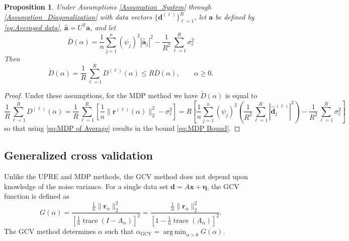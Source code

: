 \documentclass[12pt]{article}
\newcommand{\aVec}{\mathbf{a}}	%
\newcommand{\dVec}{\mathbf{d}}	%
\newcommand{\rVec}{\mathbf{r}}	%
\newcommand{\xVec}{\mathbf{x}}	%
\newcommand{\trans}[1]{{#1}^\mathsf{T}}	%
\DeclareMathOperator{\trace}{trace}		%
\newcommand{\dft}[1]{\widehat{#1}}	%
\newcommand{\regparam}{\alpha}  %
\DeclareMathOperator*{\argmin}{arg\,min}
\newcommand{\mfilt}{\psi}
\newcommand{\noise}{\eta}	%
\newcommand{\noiseSD}{\sigma}	%
\newcommand{\noiseVec}{\bm{\noise}}	%
\newcommand{\regres}{\mathbf{r}_{\regparam}}	%
\newcommand{\A}{A_{\regparam}}	%
\newcommand{\G}{G}	%
\newcommand{\GCV}{\text{GCV}}	%
\newcommand{\D}{D}	%
\newtheorem{proposition}{Proposition}[section]
\begin{document}
\begin{proposition}
Under Assumptions \ref{Assumption_System} through \ref{Assumption_Diagonalization} with data vectors $\{\dVec^{(\ell)}\}_{\ell=1}^R$, let $\aVec$ be defined by \eqref{eq:Averaged data}, $\dft{\aVec} = \trans{U}\aVec$, and let
\begin{equation}
\label{eq:MDP of Average}
\overline{\D}(\regparam) = \frac{1}{n}\sum_{j=1}^{n} \left(\mfilt_j\right)^2 |\dft{\aVec}_j|^2 - \frac{1}{R^2}\sum_{\ell=1}^R \noiseSD_{\ell}^2
\end{equation}
Then
\begin{equation}
\label{eq:MDP Bound}
\widetilde{\D}(\regparam) = \frac{1}{R} \sum_{\ell=1}^R \D^{(\ell)}(\regparam) \leq R \overline{\D}(\regparam), \qquad \regparam \geq 0.
\end{equation}
\end{proposition}
\begin{proof}
Under these assumptions, for the MDP method we have $\widetilde{\D}(\regparam)$ is equal to
\[\frac{1}{R} \sum_{\ell=1}^R \D^{(\ell)}(\regparam) = \frac{1}{R}\sum_{\ell=1}^R \left[\frac{1}{n}\|\rVec^{(\ell)}(\regparam)\|_2^2 - \noiseSD_{\ell}^2\right] = R\left[\frac{1}{n}\sum_{j=1}^{n} \left(\mfilt_j\right)^2\left(\frac{1}{R^2} \sum_{\ell=1}^R |\dft{\dVec}_j^{(\ell)}|^2\right) - \frac{1}{R^2}\sum_{\ell=1}^R \noiseSD_{\ell}^2\right]\]
so that using \eqref{eq:MDP of Average} results in the bound \eqref{eq:MDP Bound}.
\end{proof}

\subsection{Generalized cross validation} \label{sec:GCV}
Unlike the UPRE and MDP methods, the GCV method does not depend upon knowledge of the noise variance. For a single data set $\dVec = A\xVec + \noiseVec$, the GCV function is defined as
\begin{equation}
\label{eq:GCV}
\G(\regparam) = \frac{\frac{1}{n}\|\regres\|_2^2}{\left[\frac{1}{n}\trace(I-\A)\right]^2} = \frac{\frac{1}{n}\|\regres\|_2^2}{\left[1 - \frac{1}{n}\trace(\A)\right]^2}.
\end{equation}
The GCV method determines $\regparam$ such that $\regparam_\GCV = \argmin_{\regparam > 0} \G(\regparam)$.
\end{document}
